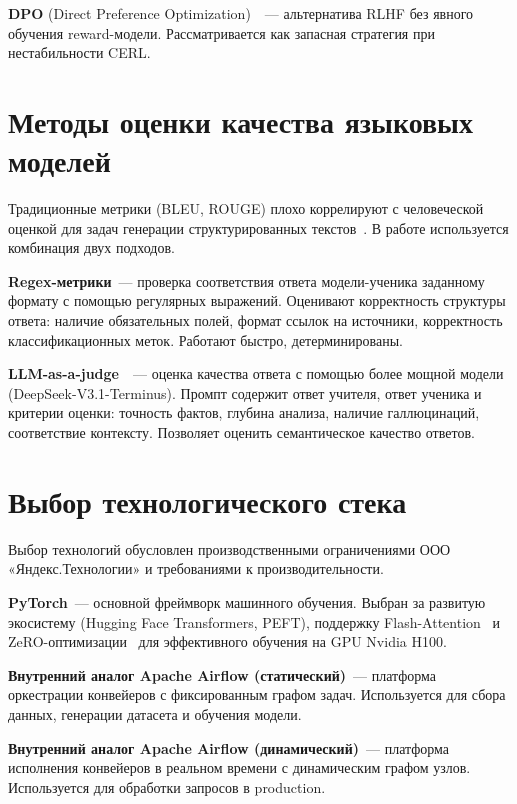 \documentclass[times]{itmo-student-thesis}
\begin{document}
\textbf{DPO} (Direct Preference Optimization)~\cite{rafailov2023dpo}~--- альтернатива
RLHF без явного обучения reward-модели. Рассматривается как запасная
стратегия при нестабильности CERL.

\section{Методы оценки качества языковых моделей}

Традиционные метрики (BLEU, ROUGE) плохо коррелируют с человеческой
оценкой для задач генерации структурированных текстов~\cite{llm-eval-survey}.
В работе используется комбинация двух подходов.

\textbf{Regex-метрики}~--- проверка соответствия ответа модели-ученика
заданному формату с помощью регулярных выражений. Оценивают корректность
структуры ответа: наличие обязательных полей, формат ссылок на источники,
корректность классификационных меток. Работают быстро, детерминированы.

\textbf{LLM-as-a-judge}~\cite{zheng2023judging}~--- оценка качества ответа
с помощью более мощной модели (DeepSeek-V3.1-Terminus). Промпт содержит
ответ учителя, ответ ученика и критерии оценки: точность фактов,
глубина анализа, наличие галлюцинаций, соответствие контексту.
Позволяет оценить семантическое качество ответов.

\section{Выбор технологического стека}

Выбор технологий обусловлен производственными ограничениями
ООО «Яндекс.Технологии» и требованиями к производительности.

\textbf{PyTorch}~--- основной фреймворк машинного обучения. Выбран за развитую
экосистему (Hugging Face Transformers, PEFT), поддержку
Flash-Attention~\cite{dao2022flashattention, dao2023flashattention2}
и ZeRO-оптимизации~\cite{rajbhandari2020zero} для эффективного обучения
на GPU Nvidia H100.

\textbf{Внутренний аналог Apache Airflow (статический)}~--- платформа
оркестрации конвейеров с фиксированным графом задач. Используется для
сбора данных, генерации датасета и обучения модели.

\textbf{Внутренний аналог Apache Airflow (динамический)}~--- платформа
исполнения конвейеров в реальном времени с динамическим графом узлов.
Используется для обработки запросов в production.
\end{document}
